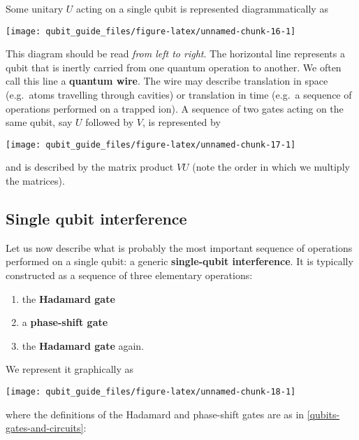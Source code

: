 \documentclass[fleqn]{article}
\providecommand{\tightlist}{%
  \setlength{\itemsep}{0pt}\setlength{\parskip}{0pt}}
\begin{document}
Some unitary \(U\) acting on a single qubit is represented diagrammatically as

\begin{center}\texttt{[image: qubit\_guide\_files/figure-latex/unnamed-chunk-16-1]} \end{center}

This diagram should be read \emph{from left to right}.
The horizontal line represents a qubit that is inertly carried from one quantum operation to another.
We often call this line a \textbf{quantum wire}.
The wire may describe translation in space (e.g.~atoms travelling through cavities) or translation in time (e.g.~a sequence of operations performed on a trapped ion).
A sequence of two gates acting on the same qubit, say \(U\) followed by \(V\), is represented by

\begin{center}\texttt{[image: qubit\_guide\_files/figure-latex/unnamed-chunk-17-1]} \end{center}

and is described by the matrix product \(VU\) (note the order in which we multiply the matrices).

\hypertarget{single-qubit-interference}{%
\subsection{Single qubit interference}\label{single-qubit-interference}}

Let us now describe what is probably the most important sequence of operations performed on a single qubit: a generic \textbf{single-qubit interference}.
It is typically constructed as a sequence of three elementary operations:

\begin{enumerate}
\def\labelenumi{\arabic{enumi}.}
\tightlist
\item
  the \textbf{Hadamard gate}
\item
  a \textbf{phase-shift gate}
\item
  the \textbf{Hadamard gate} again.
\end{enumerate}

We represent it graphically as

\begin{center}\texttt{[image: qubit\_guide\_files/figure-latex/unnamed-chunk-18-1]} \end{center}

where the definitions of the Hadamard and phase-shift gates are as in \ref{qubits-gates-and-circuits}:
\end{document}
